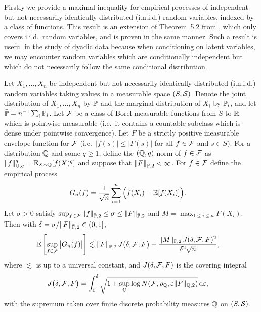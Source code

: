 Firstly we provide a maximal inequality
for empirical processes of
independent but not necessarily identically distributed
(i.n.i.d.)
random variables,
indexed by a class of functions.
This result is an extension
of Theorem~5.2 from \citet{chernozhukov2014gaussian},
which only covers i.i.d.\ random variables,
and is proven in the same manner.
Such a result is useful in the study of dyadic data
because when conditioning on latent variables,
we may encounter
random variables which are conditionally independent
but which do not necessarily follow the same
conditional distribution.

\begin{lemma}
  \label{lem:maximal_entropy}

  Let $X_1, \dots, X_n$
  be independent but not necessarily identically distributed
  (i.n.i.d.)
  random variables taking values in a
  measurable space $(S,\cS)$.
  Denote the joint distribution of
  $X_1,\ldots,X_n$ by $\P$
  and the marginal distribution of
  $X_i$ by $\P_i$,
  and let $\bar\P = n^{-1} \sum_i \P_i$.
  Let $\cF$ be a class of Borel measurable functions
  from $S$ to $\R$
  which is pointwise measurable
  (i.e.\ it contains a countable subclass which
  is dense under pointwise convergence).
  Let $F$ be a strictly positive
  measurable envelope function for $\cF$
  (i.e.\ $|f(s)| \leq |F(s)|$ for all $f \in \cF$
  and $s \in S$).
  For a distribution $\Q$ and some $q \geq 1$,
  define the $(\Q,q)$-norm of $f \in \cF$ as
  $\|f\|_{\Q,q}^q = \E_{X \sim \Q}[f(X)^q]$
  and suppose that
  $\|F\|_{\bar\P,2} < \infty$.
  For $f \in \cF$
  define the empirical process
  \begin{align*}
    G_n(f)
    &=
    \frac{1}{\sqrt n}
    \sum_{i=1}^n
    \Big(
    f(X_i) - \E[f(X_i)]
    \Big).
  \end{align*}
  Let $\sigma > 0$ satisfy
  $\sup_{f \in \cF}
  \|f\|_{\bar\P,2}
  \leq
  \sigma
  \leq
  \|F\|_{\bar\P,2}$
  and
  $M = \max_{1 \leq i \leq n} F(X_i)$.
  Then with
  $\delta = \sigma / \|F\|_{\bar\P,2} \in (0,1]$,
  \begin{align*}
    \E \left[
      \sup_{f \in \cF}
      \big| G_n(f) \big|
    \right]
    &\lesssim
    \|F\|_{\bar\P,2}
    \, J\big(\delta, \cF, F \big)
    +
    \frac{\|M\|_{\P,2} \, J(\delta, \cF, F)^2}{\delta^2 \sqrt{n}},
  \end{align*}
  where $\lesssim$ is up to a universal constant,
  and $J(\delta, \cF, F)$ is the covering integral
  \begin{align*}
    J\big(\delta, \cF, F\big)
    &=
    \int_0^\delta
    \sqrt{1 +
    \sup_\Q \log N(\cF, \rho_\Q, \varepsilon \|F\|_{\Q,2})}
    \diff{\varepsilon},
  \end{align*}
  with the supremum taken over finite discrete probability
  measures $\Q$ on $(S, \cS)$.

\end{lemma}


